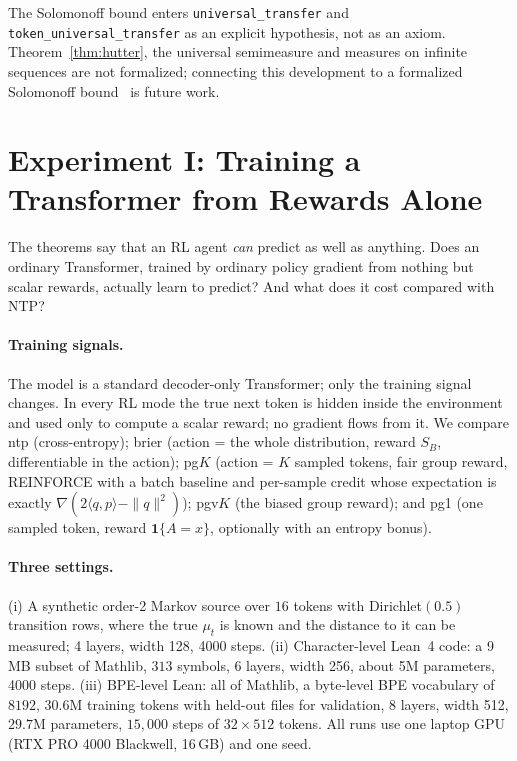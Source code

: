 \documentclass[11pt]{article}
\theoremstyle{definition}
\newcommand{\one}{\mathbf{1}}
\begin{document}
\noindent The Solomonoff bound enters \texttt{universal\_transfer} and \texttt{token\_universal\_transfer} as an explicit hypothesis, not as an axiom. Theorem~\ref{thm:hutter}, the universal semimeasure and measures on infinite sequences are not formalized; connecting this development to a formalized Solomonoff bound~\cite{milovanov2026kolmogorov} is future work.

\section{Experiment I: Training a Transformer from Rewards Alone}\label{sec:exp1}

\begin{plain}
The theorems say that an RL agent \emph{can} predict as well as anything. Does an ordinary Transformer, trained by ordinary policy gradient from nothing but scalar rewards, actually learn to predict? And what does it cost compared with NTP?
\end{plain}

\paragraph{Training signals.} The model is a standard decoder-only Transformer; only the training signal changes. In every RL mode the true next token is hidden inside the environment and used only to compute a scalar reward; no gradient flows from it. We compare \textsf{ntp} (cross-entropy); \textsf{brier} (action = the whole distribution, reward $S_B$, differentiable in the action); \textsf{pg}$K$ (action = $K$ sampled tokens, fair group reward, REINFORCE with a batch baseline and per-sample credit whose expectation is exactly $\nabla(2\langle q,p\rangle-\|q\|^2)$); \textsf{pgv}$K$ (the biased group reward); and \textsf{pg1} (one sampled token, reward $\one\{A=x\}$, optionally with an entropy bonus).

\paragraph{Three settings.} (i) A synthetic order-2 Markov source over $16$ tokens with Dirichlet$(0.5)$ transition rows, where the true $\mu_t$ is known and the distance to it can be measured; 4 layers, width 128, 4000 steps. (ii) Character-level Lean~4 code: a 9\,MB subset of Mathlib, $313$ symbols, 6 layers, width 256, about 5M parameters, 4000 steps. (iii) BPE-level Lean: all of Mathlib, a byte-level BPE vocabulary of $8192$, $30.6$M training tokens with held-out files for validation, 8 layers, width 512, $29.7$M parameters, $15{,}000$ steps of $32\times512$ tokens. All runs use one laptop GPU (RTX PRO 4000 Blackwell, 16\,GB) and one seed.
\end{document}
